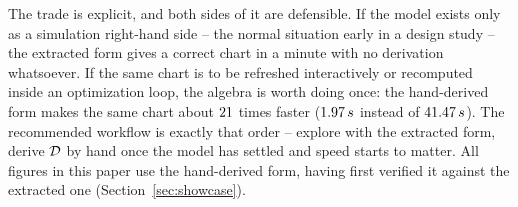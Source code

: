 The trade is explicit, and both sides of it are defensible. If the model
exists only as a simulation right-hand side -- the normal situation early in
a design study -- the extracted form gives a correct chart in a minute with
no derivation whatsoever. If the same chart is to be refreshed interactively
or recomputed inside an optimization loop, the algebra is worth doing once:
the hand-derived form makes the same chart about $21$ times faster
($1.97\,s$ instead of $41.47\,s$). The
recommended workflow is exactly that order -- explore with the extracted
form, derive $\mathcal{D}$ by hand once the model has settled and speed starts to
matter. All figures in this paper use the hand-derived form, having first
verified it against the extracted one (Section~\ref{sec:showcase}).